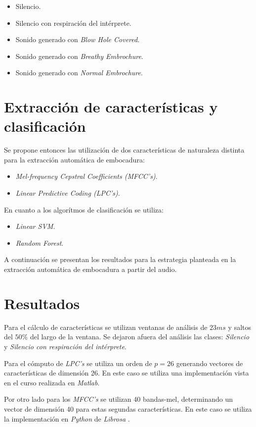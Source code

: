 \documentclass{article}
\begin{document}
\begin{itemize} 
  \item Silencio.
  \item Silencio con respiración del intérprete. 
  \item Sonido generado con \textit{Blow Hole Covered}.
  \item Sonido generado con \textit{Breathy Embrochure}.
  \item Sonido generado con \textit{Normal Embrochure}.
\end{itemize}
 

\section*{Extracción de características y clasificación}
Se propone entonces las utilización de dos características de naturaleza distinta para la extracción automática de embocadura:  

\begin{itemize} 
  \item \textit{Mel-frequency Cepstral Coefficients (MFCC's)}.
  \item \textit{Linear Predictive Coding (LPC's)}.
\end{itemize}

En cuanto a los algorítmos de clasificación se utiliza:  
\begin{itemize} 
  \item \textit{Linear SVM}.
  \item \textit{Random Forest}.
\end{itemize}

A continuación se presentan los resultados para la estrategia planteada en la extracción automática de embocadura a partir del audio.

\section*{Resultados}
Para el cálculo de características se utilizan ventanas de análisis de $23ms$ y saltos del $50\%$ del largo de la ventana. Se dejaron afuera del análisis las clases: \textit{Silencio} y \textit{Silencio con respiración del intérprete}.
\medskip

Para el cómputo de \textit{LPC's} se utiliza un orden de $p=26$ generando vectores de características de dimensión 26. En este caso se utiliza una implementación vista en el curso realizada en \textit{Matlab}. 
\medskip

Por otro lado para los \textit{MFCC's} se utilizan 40 bandas-mel, determinando un vector de dimensión 40 para estas segundas características. En este caso se utiliza la implementación en \textit{Python} de \textit{Librosa} \citep{mcfee2015librosa}.	
\medskip
\end{document}

